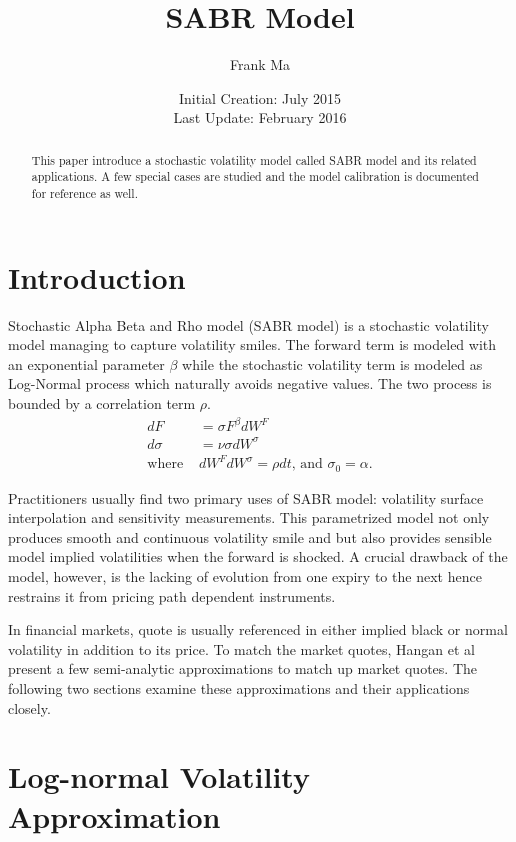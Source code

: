 \documentclass{article}
\title{SABR Model}
\author{Frank Ma}
\date{Initial Creation: July 2015 \\ Last Update: February 2016}
\begin{document}
\maketitle

\begin{abstract}
    This paper introduce a stochastic volatility model called SABR model and its related applications.
    A few special cases are studied and the model calibration is documented for reference as well.
\end{abstract}

\section{Introduction}

Stochastic Alpha Beta and Rho model (SABR model) is a stochastic volatility model managing to capture volatility smiles.
The forward term is modeled with an exponential parameter $ \beta $ while the stochastic volatility term is modeled as Log-Normal process which naturally avoids negative values.
The two process is bounded by a correlation term $ \rho $.
\begin{align}
    d F &= \sigma F^{\beta} d W^F \\
    d \sigma &= \nu \sigma d W^{\sigma} \\
    \text{where } & d W^F d W^{\sigma} = \rho d t \text{, and } {\sigma}_0 = \alpha \text{.}\nonumber
\end{align}

Practitioners usually find two primary uses of SABR model: volatility surface interpolation and sensitivity measurements.
This parametrized model not only produces smooth and continuous volatility smile and but also provides sensible model implied volatilities when the forward is shocked.
A crucial drawback of the model, however, is the lacking of evolution from one expiry to the next hence restrains it from pricing path dependent instruments.

In financial markets, quote is usually referenced in either implied black or normal volatility in addition to its price.
To match the market quotes, Hangan et al \cite{Managing Smile Risk} present a few semi-analytic approximations to match up market quotes.
The following two sections examine these approximations and their applications closely.


\section{Log-normal Volatility Approximation}
\end{document}
